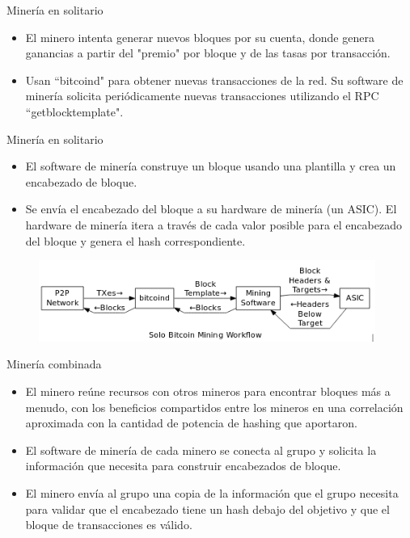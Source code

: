 \documentclass[compress,brown,xcolor=table]{beamer}
\begin{document}
\begin{frame}{Minería en solitario}
\begin{itemize}
	\item El minero intenta generar nuevos bloques por su cuenta, donde genera ganancias a partir del "premio" por bloque y de las tasas por transacción.\\

	\item Usan ``bitcoind" para obtener nuevas transacciones de la red. Su software de minería solicita periódicamente nuevas transacciones utilizando el RPC ``getblocktemplate".\\
\end{itemize}
\end{frame}

\begin{frame}{Minería en solitario}
\begin{itemize}
\item El software de minería construye un bloque usando una plantilla y crea un encabezado de bloque.

\item Se envía el encabezado del bloque a su hardware de minería (un ASIC). El hardware de minería itera a través de cada valor posible para el encabezado del bloque y genera el hash correspondiente.
\end{itemize}

\begin{figure}[h]
	\includegraphics[width=11cm]{../images/Image5.png}
	\centering		
	\label{p5}
\end{figure}

\end{frame}

\begin{frame}{Minería combinada}
\begin{itemize}
	\item El minero reúne recursos con otros mineros para encontrar bloques más a menudo, con los beneficios compartidos entre los mineros en una correlación aproximada con la cantidad de potencia de hashing que aportaron.\\

	\item El software de minería de cada minero se conecta al grupo y solicita la información que necesita para construir encabezados de bloque.\\

	\item El minero envía al grupo una copia de la información que el grupo necesita para validar que el encabezado tiene un hash debajo del objetivo y que el bloque de transacciones es válido.\\
\end{itemize}
\end{frame}
\end{document}
